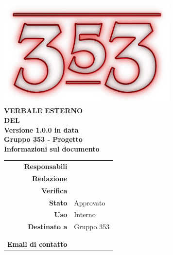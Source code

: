 \documentclass[openany, a4paper, 12pt]{report}
\begin{document}
\begin{titlepage}
	\centering
	\vfill
	{
		\bfseries
		\vskip2cm
		\includegraphics[width=9cm]{../../common/images/logo.png} \\
		\vfill
		\Huge{VERBALE ESTERNO\\DEL {}}\\
		\vfill
		\Large Versione 1.0.0 in data \\
		\large Gruppo 353 - Progetto \progetto \\
		\vfill
		\normalsize Informazioni sul documento\\
		\begin{table}[htbp]
			\centering
			\renewcommand\arraystretch{1.2}
			\begin{tabular}{r|l}
				\hline
				\textbf{Responsabili}	& \Parwinder\\
				
				\textbf{Redazione} 		& \Valentina \\
				\textbf{Verifica} 		& \Elena \\	
				
				\textbf{Stato} 			& Approvato\\
				\textbf{Uso}			& Interno\\
				\textbf{Destinato a}   	& Gruppo 353\\
										& \Vardanega\\
										& \Cardin\\
				
				\textbf{Email di contatto}	& \mailgroup
			\end{tabular}
		\end{table}
		\vfill 
	}    
\end{titlepage}

\tableofcontents
\newpage
{}

 
\end{document}
